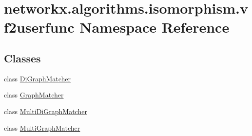 \hypertarget{namespacenetworkx_1_1algorithms_1_1isomorphism_1_1vf2userfunc}{}\section{networkx.\+algorithms.\+isomorphism.\+vf2userfunc Namespace Reference}
\label{namespacenetworkx_1_1algorithms_1_1isomorphism_1_1vf2userfunc}
\subsection*{Classes}
\begin{DoxyCompactItemize}
\item 
class \hyperlink{classnetworkx_1_1algorithms_1_1isomorphism_1_1vf2userfunc_1_1DiGraphMatcher}{Di\+Graph\+Matcher}
\item 
class \hyperlink{classnetworkx_1_1algorithms_1_1isomorphism_1_1vf2userfunc_1_1GraphMatcher}{Graph\+Matcher}
\item 
class \hyperlink{classnetworkx_1_1algorithms_1_1isomorphism_1_1vf2userfunc_1_1MultiDiGraphMatcher}{Multi\+Di\+Graph\+Matcher}
\item 
class \hyperlink{classnetworkx_1_1algorithms_1_1isomorphism_1_1vf2userfunc_1_1MultiGraphMatcher}{Multi\+Graph\+Matcher}
\end{DoxyCompactItemize}


